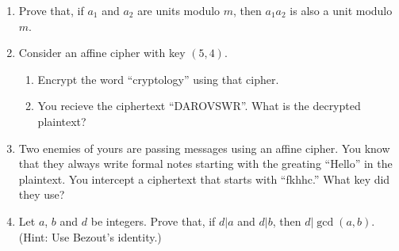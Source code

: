 \documentclass[11pt]{article}
\begin{document}
\begin{enumerate}
    \item Prove that, if \(a_1\) and \(a_2\) are units modulo \(m\), then \(a_1 a_2\) is also a unit modulo \(m\).

    \item Consider an affine cipher with key \((5,4)\).
      \begin{enumerate}
        \item Encrypt the word ``cryptology'' using that cipher.
        \item You recieve the ciphertext ``DAROVSWR''.  What is the decrypted plaintext?
      \end{enumerate}

    \item Two enemies of yours are passing messages using an affine cipher.  You know that they always write formal notes starting with the greating ``Hello'' in the plaintext.  You intercept a ciphertext that starts with ``fkhhc.'' What key did they use?

    \item Let \(a\), \(b\) and \(d\) be integers. Prove that, if \(d|a\) and \(d|b\), then \(d| \gcd(a,b)\). (Hint: Use Bezout’s identity.)
  \end{enumerate}
\end{document}
